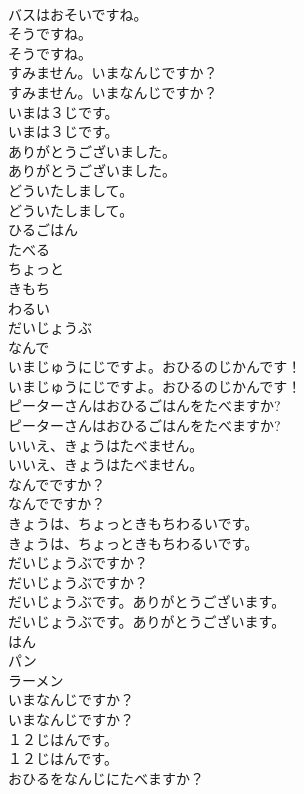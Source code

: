 \documentclass[8pt]{extreport}
\begin{document}
\begin{CJK}{UTF8}{min}
\\	バスはおそいですね。 
\\	そうですね。	
\\	そうですね。 
\\	すみません。いまなんじですか？	
\\	すみません。いまなんじですか？ 
\\	いまは３じです。	
\\	いまは３じです。 
\\	ありがとうございました。	
\\	ありがとうございました。 
\\	どういたしまして。	
\\	どういたしまして。 
\\	ひるごはん
\\	たべる
\\	ちょっと
\\	きもち
\\	わるい
\\	だいじょうぶ
\\	なんで
\\	いまじゅうにじですよ。おひるのじかんです！	
\\	いまじゅうにじですよ。おひるのじかんです！ 
\\	ピーターさんはおひるごはんをたべますか?	
\\	ピーターさんはおひるごはんをたべますか? 
\\	いいえ、きょうはたべません。	
\\	いいえ、きょうはたべません。 
\\	なんでですか？	
\\	なんでですか？ 
\\	きょうは、ちょっときもちわるいです。	
\\	きょうは、ちょっときもちわるいです。 
\\	だいじょうぶですか？	
\\	だいじょうぶですか？ 
\\	だいじょうぶです。ありがとうございます。	
\\	だいじょうぶです。ありがとうございます。 
\\	はん
\\	パン
\\	ラーメン
\\	いまなんじですか？	
\\	いまなんじですか？ 
\\	１２じはんです。	
\\	１２じはんです。 
\\	おひるをなんじにたべますか？	

\end{CJK}
\end{document}
